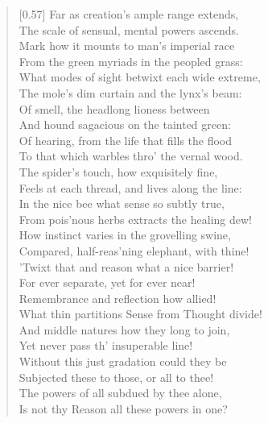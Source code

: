 \begin{verse}[0.57\textwidth]
Far as creation's ample range extends,\\
The scale of sensual, mental powers ascends.\\
Mark how it mounts to man's imperial race\\
From the green myriads in the peopled grass:\\
What modes of sight betwixt each wide extreme,\\
The mole's dim curtain and the lynx's beam:\\
Of smell, the headlong lioness between\\
And hound sagacious on the tainted green:\\
Of hearing, from the life that fills the flood\\
To that which warbles thro' the vernal wood.\\
The spider's touch, how exquisitely fine,\\
Feels at each thread, and lives along the line:\\
In the nice bee what sense so subtly true,\\
From pois'nous herbs extracts the healing dew!\\
How instinct varies in the grovelling swine,\\
Compared, half-reas'ning elephant, with thine!\\
'Twixt that and reason what a nice barrier!\\
For ever separate, yet for ever near!\\
Remembrance and reflection how allied!\\
What thin partitions Sense from Thought divide!\\
And middle natures how they long to join,\\
Yet never pass th' insuperable line!\\
Without this just gradation could they be\\
Subjected these to those, or all to thee!\\
The powers of all subdued by thee alone,\\
Is not thy Reason all these powers in one?


\end{verse}
